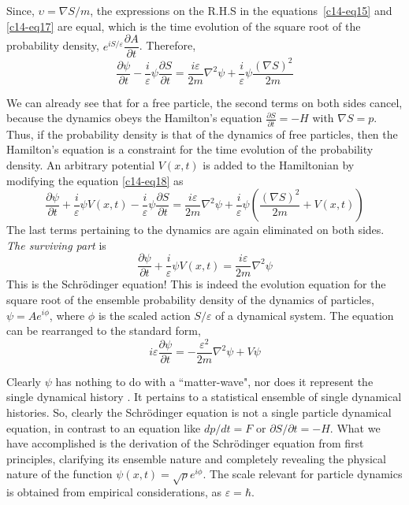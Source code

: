 Since, $\upsilon = \nabla S/m$, the expressions on the R.H.S in the equations~\ref{c14-eq15} and \ref{c14-eq17} are equal,
which is the time evolution of the square root of the probability density, $e^{iS/ \varepsilon} \dfrac{\partial A}{\partial t}$. Therefore,
\begin{equation*}
\frac{\partial \psi}{\partial t} - \frac{i}{\varepsilon} \psi \frac{\partial S}{\partial t} = \frac{i\varepsilon}{2m} \nabla^2 \psi + \frac{i}{\varepsilon} \psi\frac{(\nabla S)^2}{2m} \tag{18}\label{c14-eq18}
\end{equation*}

We can already see that for a free particle, the second terms on both sides cancel, because
the dynamics obeys the Hamilton's equation $\frac{\partial S}{\partial t} = -H$
with $\nabla S = p$. Thus, if the probability density is that of the dynamics of free particles, then
the Hamilton's equation is a constraint for the time evolution of the probability density.
An arbitrary potential $V(x, t)$ is added to the Hamiltonian by modifying the equation \ref{c14-eq18} as
\begin{equation*}
\frac{\partial\psi}{\partial t}+\frac{i}{\varepsilon}\psi V(x,t)-\frac{i}{\varepsilon}\psi\frac{\partial S}{\partial t}=
\frac{i\varepsilon}{2m}\nabla^2\psi+\frac{i}{\varepsilon}\psi\left(
\frac{(\nabla S)^2}{2m}+V(x,t)\right)\tag{19}\label{c14-eq19}
\end{equation*}
The last terms pertaining to the dynamics are again eliminated on both sides. \textit{The surviving part} is
\begin{equation*}
\frac{\partial \psi}{\partial t}+\frac{i}{\varepsilon}\psi V(x,t)=\frac{i\varepsilon}{2m}\nabla^2\psi\tag{20}\label{c14-eq20}
\end{equation*}
This is the Schr\"{o}dinger equation! This is indeed the evolution equation for the square root
of the ensemble probability density of the dynamics of particles, $\psi = Ae^{i\phi}$, where $\phi$ is the
scaled action $S/\varepsilon$ of a dynamical system. The equation can be rearranged to the standard
form,
\begin{equation*}
i \varepsilon \frac{\partial \psi}{\partial t} = - \frac{\varepsilon^2}{2m} \nabla^2 \psi + V \psi \tag{21}\label{c14-eq21}
\end{equation*}

Clearly $\psi$ has nothing to do with a ``matter-wave", nor does it represent the single dynamical
history \cite{chap14-key2}. It pertains to a statistical ensemble of single dynamical histories. So, clearly the
Schr\"{o}dinger equation is not a single particle dynamical equation, in contrast to an equation
like $dp/dt = F$ or $\partial S/\partial t=-H$. What we have accomplished is the derivation of the Schr\"{o}dinger equation
from first principles, clarifying its ensemble nature and completely revealing the physical
nature of the function $\psi (x, t) = \sqrt{\rho}e^{i\phi}$. The scale relevant for particle dynamics is obtained
from empirical considerations, as $\varepsilon = \hbar$.

